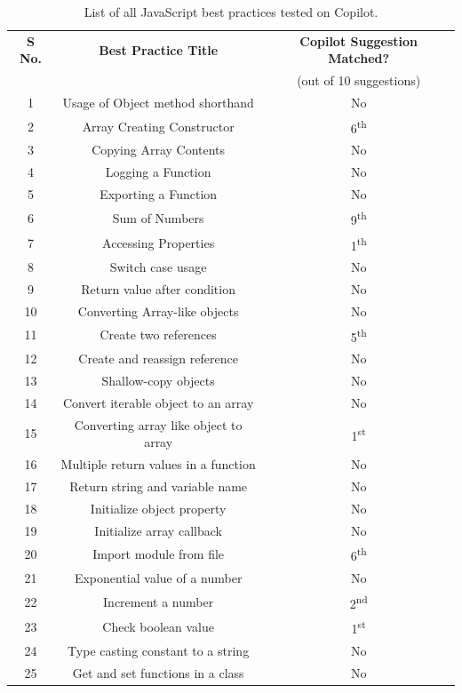 \begin{table}[hbt!]
\begin{tabular}{|c|c|c|}
        \textbf{S No.} & \textbf{Best Practice  Title} & \textbf{Copilot Suggestion Matched?} \\
         & & (out of 10 suggestions) \\
         \hline
         1 & Usage of Object method shorthand & No \\
         \hline
         2 & Array Creating Constructor & 6\textsuperscript{th} \\
         \hline
         3 & Copying Array Contents  & No \\
         \hline
         4 & Logging a Function &  No \\
         \hline
         5 & Exporting a Function & No \\
         \hline
         6 & Sum of Numbers & 9\textsuperscript{th} \\
         \hline
         7 & Accessing Properties & 1\textsuperscript{th} \\
         \hline
         8 & Switch case usage & No \\
         \hline
         9 & Return value after condition & No \\
         \hline
         10 & Converting Array-like objects  & No \\
         \hline
         11 & Create two references & 5\textsuperscript{th} \\
         \hline
         12 & Create and reassign reference & No \\
         \hline
         13 & Shallow-copy objects  & No \\
         \hline
         14 & Convert iterable object to an array & No \\
         \hline
         15 & Converting array like object to array & 1\textsuperscript{st} \\
         \hline
          16 & Multiple return values in a function & No \\
          \hline
          17 & Return string and variable name & No \\
          \hline
          18 & Initialize object property & No \\
          \hline
          19 & Initialize array callback & No \\
          \hline
          20 & Import module from file & 6\textsuperscript{th} \\
          \hline
          21 & Exponential value of a number & No \\
          \hline
          22 & Increment a number & 2\textsuperscript{nd} \\
          \hline
          23 & Check boolean value & 1\textsuperscript{st} \\
          \hline
          24 & Type casting constant to a string & No \\
          \hline
          25 & Get and set functions in a class & No \\
          \hline
    \end{tabular}
    \caption{List of all JavaScript best practices tested on Copilot.}
    \label{tab:all_bp}
\end{table}
